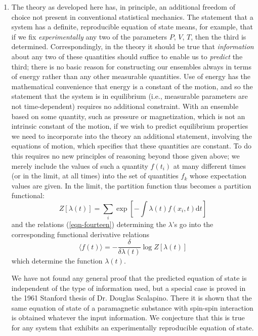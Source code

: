 \documentclass[]{article}
\begin{document}
\begin{enumerate}
\item The theory as developed here has, in principle, an additional freedom of choice not present in conventional statistical mechanics. The statement that a system has a definite, reproducible equation of state means, for example, that if we fix \emph{experimentally} any two of the parameters $P$, $V$, $T$, then the third is determined. Correspondingly, in the theory it should be true that \emph{information} about any two of these quantities should suffice to enable us to \emph{predict} the third; there is no basic reason for constructing our ensembles always in terms of energy rather than any other measurable quantities. Use of energy has the mathematical convenience that energy is a constant of the motion, and so the statement that the system is in equilibrium (i.e., measurable parameters are not time-dependent) requires no additional constraint. With an ensemble based on some quantity, such as pressure or magnetization, which is not an intrinsic constant of the motion, if we wish to predict equilibrium properties we need to incorporate into the theory an additional statement, involving the equations of motion, which specifies that these quantities are constant. To do this requires no new principles of reasoning beyond those given above; we merely include the values of such a quantity $f \left( t _{ i }\right)$ at many different times (or in the limit, at all times) into the set of quantities $f _{ k }$ whose expectation values are given. In the limit, the partition function thus becomes a partition functional:
\begin{equation}
Z [\lambda( t )]=\sum_{ i } \exp \left[-\int \lambda( t ) f \left( x _{ i }, t \right)\text{d}t \right] \label{eqn-fifty}
\end{equation}
and the relations (\ref{eqn-fourteen}) determining the $\lambda$'s go into the corresponding functional derivative relations
\begin{equation}
\langle f(t)\rangle=-\frac{\delta}{\delta \lambda(t)} \log Z[\lambda(t)] \label{eqn-fifty-one}
\end{equation}
which determine the function $\lambda(t)$. 

We have not found any general proof that the predicted equation of state is independent of the type of information used, but a special case is proved in the 1961 Stanford thesis of Dr. Douglas Scalapino. There it is shown that the same equation of state of a paramagnetic substance with spin-spin interaction is obtained whatever the input information. We conjecture that this is true for any system that exhibits an experimentally reproducible equation of state.


\end{enumerate}
\end{document}
